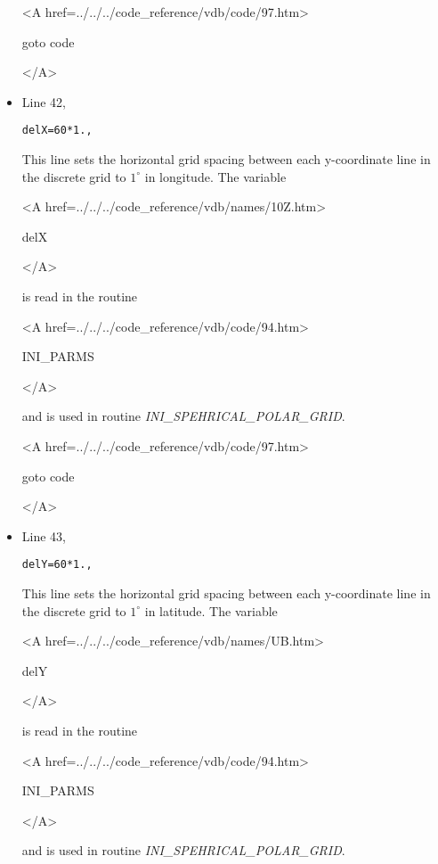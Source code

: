 \begin{itemize}
{\bf
\begin{rawhtml} <A href=../../../code_reference/vdb/code/97.htm> \end{rawhtml}
goto code
\begin{rawhtml} </A>\end{rawhtml}
}

\item Line 42,
\begin{verbatim}
delX=60*1.,
\end{verbatim}
This line sets the horizontal grid spacing between each y-coordinate line
in the discrete grid to $1^{\circ}$ in longitude.
The variable
{\bf
\begin{rawhtml} <A href=../../../code_reference/vdb/names/10Z.htm> \end{rawhtml}
delX
\begin{rawhtml} </A>\end{rawhtml}
}
is read in the routine
{\it
\begin{rawhtml} <A href=../../../code_reference/vdb/code/94.htm> \end{rawhtml}
INI\_PARMS
\begin{rawhtml} </A>\end{rawhtml}
} and is used in routine {\it INI\_SPEHRICAL\_POLAR\_GRID}. 

{\bf
\begin{rawhtml} <A href=../../../code_reference/vdb/code/97.htm> \end{rawhtml}
goto code
\begin{rawhtml} </A>\end{rawhtml}
}

\item Line 43,
\begin{verbatim}
delY=60*1.,
\end{verbatim}
This line sets the horizontal grid spacing between each y-coordinate line
in the discrete grid to $1^{\circ}$ in latitude.
The variable
{\bf
\begin{rawhtml} <A href=../../../code_reference/vdb/names/UB.htm> \end{rawhtml}
delY   
\begin{rawhtml} </A>\end{rawhtml}
}
is read in the routine
{\it
\begin{rawhtml} <A href=../../../code_reference/vdb/code/94.htm> \end{rawhtml}
INI\_PARMS
\begin{rawhtml} </A>\end{rawhtml}
} and is used in routine {\it INI\_SPEHRICAL\_POLAR\_GRID}. 


\end{itemize}
